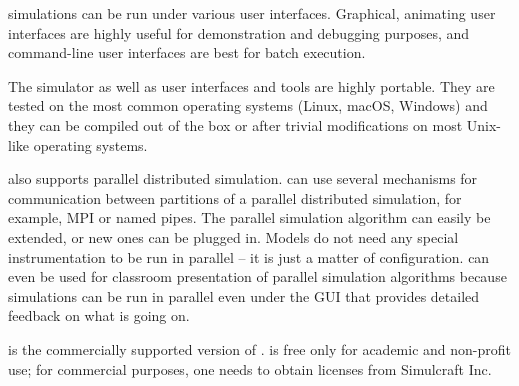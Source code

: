 {\opp} simulations can be run under various user interfaces.
Graphical, animating user interfaces are highly useful for
demonstration and debugging purposes, and command-line user
interfaces are best for batch execution.

The simulator as well as user interfaces and tools are highly portable.
They are tested on the most common operating systems (Linux, macOS,
Windows) and they can be compiled out of the box or after trivial
modifications on most Unix-like operating systems.

{\opp} also supports parallel distributed simulation. {\opp} can
use several mechanisms for communication between partitions of
a parallel distributed simulation, for example, MPI or named pipes.
The parallel simulation algorithm can easily be extended, or new
ones can be plugged in. Models do not need any special instrumentation
to be run in parallel -- it is just a matter of configuration.
{\opp} can even be used for classroom presentation of parallel
simulation algorithms because simulations can be run in parallel
even under the GUI that provides detailed feedback on what is going on.

{\omnest} is the commercially supported version of {\omnetpp}.
{\omnetpp} is free only for academic and non-profit use;
for commercial purposes, one needs to obtain {\omnest} licenses
from Simulcraft Inc.


